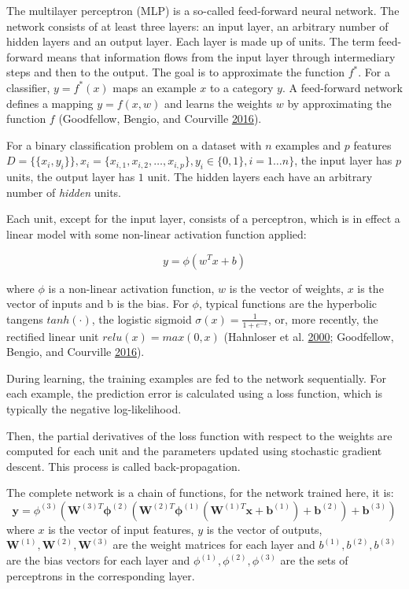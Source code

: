 \documentclass[
  11pt,
  a4paper,
  DIV=12,captions=tableheading,oneside,titlepage]{scrbook}
\begin{document}
The multilayer perceptron (MLP) is a so-called feed-forward neural network. The network consists of at least three layers: an input layer, an arbitrary number of hidden layers and an output layer. Each layer is made up of units. The term feed-forward means that information flows from the input layer through intermediary steps and then to the output. The goal is to approximate the function \(f^*\). For a classifier, \(y = f^*(x)\) maps an example \(x\) to a category \(y\). A feed-forward network defines a mapping \(y=f(x, w)\) and learns the weights \(w\) by approximating the function \(f\) (Goodfellow, Bengio, and Courville \protect\hyperlink{ref-goodfellow2016deep}{2016}).

For a binary classification problem on a dataset with \(n\) examples and \(p\) features \(D = \{\{x_i, y_i\}\}, x_i = \{x_{i,1},x_{i,2},\ldots,x_{i,p}\}, y_i \in \{0,1\}, i = 1 \ldots n\}\), the input layer has \(p\) units, the output layer has \(1\) unit. The hidden layers each have an arbitrary number of \emph{hidden} units.

Each unit, except for the input layer, consists of a perceptron, which is in effect a linear model with some non-linear activation function applied:

\begin{equation}
y = \phi(w^Tx+b)
\label{eq:perceptron}
\end{equation}

where \(\phi\) is a non-linear activation function, \(w\) is the vector of weights, \(x\) is the vector of inputs and b is the bias. For \(\phi\), typical functions are the hyperbolic tangens \(tanh(\cdot)\), the logistic sigmoid \(\sigma(x) = \frac{1}{1+e^{-x}}\), or, more recently, the rectified linear unit \(relu(x) = max(0,x)\) (Hahnloser et al. \protect\hyperlink{ref-hahnloser2000digital}{2000}; Goodfellow, Bengio, and Courville \protect\hyperlink{ref-goodfellow2016deep}{2016}).

During learning, the training examples are fed to the network sequentially. For each example, the prediction error is calculated using a loss function, which is typically the negative log-likelihood.

Then, the partial derivatives of the loss function with respect to the weights are computed for each unit and the parameters updated using stochastic gradient descent. This process is called back-propagation.

The complete network is a chain of functions, for the network trained here, it is: \begin{equation}
\mathbf{y} = \phi^{(3)}(\mathbf{W}^{(3)T} \mathbf{\phi}^{(2)}(\mathbf{W}^{(2)T} \mathbf{\phi}^{(1)}(\mathbf{W}^{(1)T} \mathbf{x} + \mathbf{b}^{(1)}) + \mathbf{b}^{(2)}) + \mathbf{b}^{(3)})
\end{equation} where \(x\) is the vector of input features, \(y\) is the vector of outputs, \(\mathbf{W}^{(1)}, \mathbf{W}^{(2)}, \mathbf{W}^{(3)}\) are the weight matrices for each layer and \(b^{(1)}, b^{(2)}, b^{(3)}\) are the bias vectors for each layer and \(\phi^{(1)}, \phi^{(2)}, \phi^{(3)}\) are the sets of perceptrons in the corresponding layer.
\end{document}
